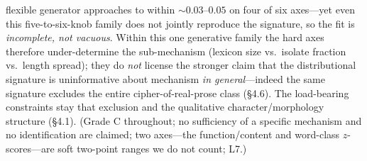 \documentclass[11pt]{article}
\begin{document}
flexible generator approaches to within $\sim\!0.03$--$0.05$ on four of six axes---yet even
this five-to-six-knob family does not jointly reproduce the signature, so the fit is
\emph{incomplete, not vacuous}. Within this one generative family the hard axes therefore
under-determine the sub-mechanism (lexicon size vs.\ isolate fraction vs.\ length spread);
they do \emph{not} license the stronger claim that the distributional signature is
uninformative about mechanism \emph{in general}---indeed the same signature excludes the
entire cipher-of-real-prose class (\S4.6). The load-bearing constraints stay that exclusion
and the qualitative character/morphology structure (\S4.1). (Grade C throughout; no
sufficiency of a specific mechanism and no identification are claimed; two axes---the
function/content and word-class $z$-scores---are soft two-point ranges we do not count; L7.)
\end{document}
